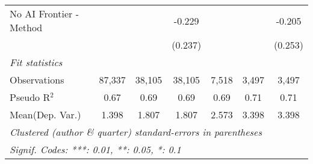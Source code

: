 \begin{tabular}{lcccccc}
   No AI Frontier - Method &                &              & -0.229        &         &         & -0.205\\   
                           &                &              & (0.237)       &         &         & (0.253)\\   
   \midrule
   \emph{Fit statistics}\\
   Observations            & 87,337         & 38,105       & 38,105        & 7,518   & 3,497   & 3,497\\  
   Pseudo R$^2$            & 0.67           & 0.69         & 0.69          & 0.69    & 0.71    & 0.71\\  
Mean(Dep. Var.) & 1.398 & 1.807 & 1.807 & 2.573 & 3.398 & 3.398 \\
   \midrule \midrule
   \multicolumn{7}{l}{\emph{Clustered (author \& quarter) standard-errors in parentheses}}\\
   \multicolumn{7}{l}{\emph{Signif. Codes: ***: 0.01, **: 0.05, *: 0.1}}\\
\end{tabular}
\par\endgroup
